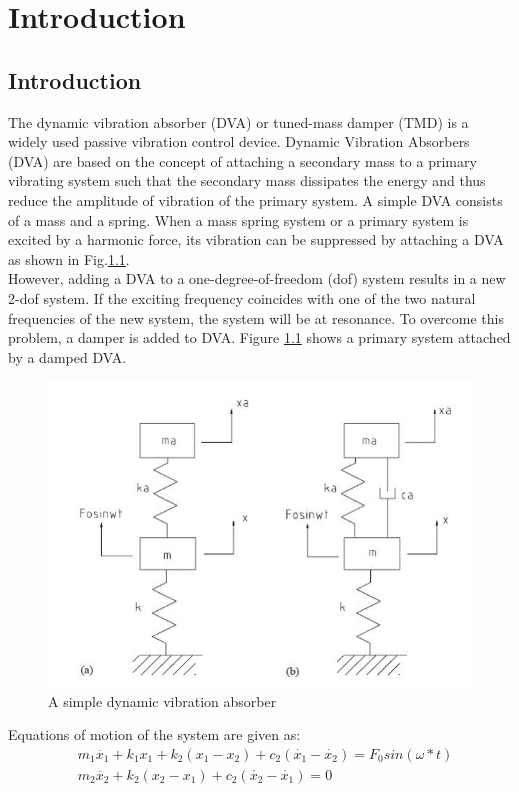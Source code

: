 %
\chapter{Introduction}
\section{Introduction}
The dynamic vibration absorber (DVA) or tuned-mass damper (TMD) is a widely used passive vibration control device. Dynamic Vibration Absorbers (DVA) are based on the concept of attaching a secondary mass to a primary vibrating system such that the secondary mass dissipates the energy and thus reduce the amplitude of vibration of the primary system. A simple DVA consists of a mass and a spring. When a mass spring system or a primary system is excited by a harmonic force, its vibration can be suppressed by attaching a DVA as shown in Fig.\ref{dva}.\\
However, adding a DVA to a one-degree-of-freedom (dof) system results in a new 2-dof system. If the exciting frequency coincides with one of the two natural frequencies of the new system, the system will be at resonance. To overcome this problem, a damper is added to DVA. Figure \ref{dva} shows a primary system attached by a damped DVA.

\begin{figure}[h]
\centering
\includegraphics[scale=0.4]{"figures/dva"}
\caption{A simple dynamic vibration absorber}
\label{dva}
\end{figure}
Equations of motion of the system are given as:
\begin{align*}
&m_1\ddot{x_1}+k_1x_1+k_2(x_1-x_2)+c_2(\dot{x_1}-\dot{x_2})=F_0sin(\omega *t) \\
&m_2\ddot{x_2}+k_2(x_2-x_1)+c_{2}(\dot{x_{2}}-\dot{x_{1}})=0
\end{align*}

